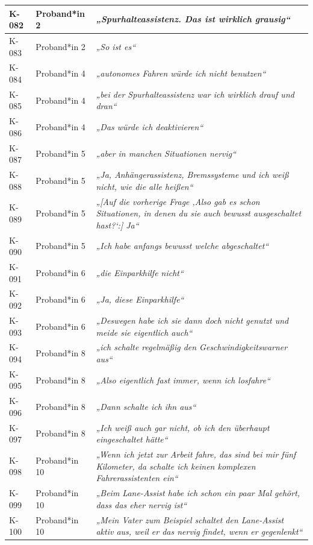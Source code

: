 {\begin{xltabular}{\textwidth}{
    |P{0.10\textwidth}
    |P{0.17\textwidth}
    |Y|
}
K-082 & Proband*in 2 & \textit{„Spurhalteassistenz. Das ist wirklich grausig“} \\
\hline
K-083 & Proband*in 2 & \textit{„So ist es“} \\
\hline
K-084 & Proband*in 4 & \textit{„autonomes Fahren würde ich nicht benutzen“} \\
\hline
K-085 & Proband*in 4 & \textit{„bei der Spurhalteassistenz war ich wirklich drauf und dran“} \\
\hline
K-086 & Proband*in 4 & \textit{„Das würde ich deaktivieren“} \\
\hline
K-087 & Proband*in 5 & \textit{„aber in manchen Situationen nervig“} \\
\hline
K-088 & Proband*in 5 & \textit{„Ja, Anhängerassistenz, Bremssysteme und ich weiß nicht, wie die alle heißen“} \\
\hline
K-089 & Proband*in 5 & \textit{„[Auf die vorherige Frage ‚Also gab es schon Situationen, in denen du sie auch bewusst ausgeschaltet hast?‘:] Ja“} \\
\hline
K-090 & Proband*in 5 & \textit{„Ich habe anfangs bewusst welche abgeschaltet“} \\
\hline
K-091 & Proband*in 6 & \textit{„die Einparkhilfe nicht“} \\
\hline
K-092 & Proband*in 6 & \textit{„Ja, diese Einparkhilfe“} \\
\hline
K-093 & Proband*in 6 & \textit{„Deswegen habe ich sie dann doch nicht genutzt und meide sie eigentlich auch“} \\
\hline
K-094 & Proband*in 8 & \textit{„ich schalte regelmäßig den Geschwindigkeitswarner aus“} \\
\hline
K-095 & Proband*in 8 & \textit{„Also eigentlich fast immer, wenn ich losfahre“} \\
\hline
K-096 & Proband*in 8 & \textit{„Dann schalte ich ihn aus“} \\
\hline
K-097 & Proband*in 8 & \textit{„Ich weiß auch gar nicht, ob ich den überhaupt eingeschaltet hätte“} \\
\hline
K-098 & Proband*in 10 & \textit{„Wenn ich jetzt zur Arbeit fahre, das sind bei mir fünf Kilometer, da schalte ich keinen komplexen Fahrerassistenten ein“} \\
\hline
K-099 & Proband*in 10 & \textit{„Beim Lane-Assist habe ich schon ein paar Mal gehört, dass das eher nervig ist“} \\
\hline
K-100 & Proband*in 10 & \textit{„Mein Vater zum Beispiel schaltet den Lane-Assist aktiv aus, weil er das nervig findet, wenn er gegenlenkt“} \\

\end{xltabular}}
